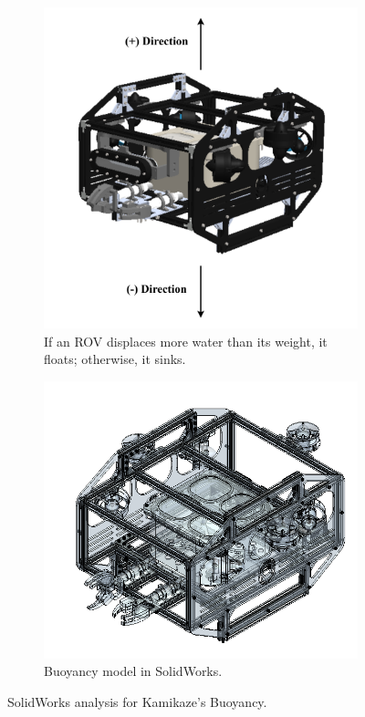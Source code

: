 \vspace{-0.5cm}
\begin{figure}[h]
    \centering
    \begin{subfigure}[t]{0.49\columnwidth}
        \includegraphics[width=\textwidth]{Sections/2Design Rationale/images/kamikaze_model.png}
        \caption{If an ROV displaces more water than its weight, it floats; otherwise, it sinks.}
        \label{fig:kamikaze}
    \end{subfigure}
    \hfill
    \begin{subfigure}[t]{0.49\columnwidth}
        \includegraphics[width=\textwidth]{Sections/2Design Rationale/images/solidworks_buoyancy.png}
        \caption{Buoyancy model in SolidWorks.}
        \label{fig:kamikaze_buoyancy}
    \end{subfigure}
    \caption{SolidWorks analysis for Kamikaze's Buoyancy.}
    \label{fig:solidworks_buoyancy}
\end{figure}

